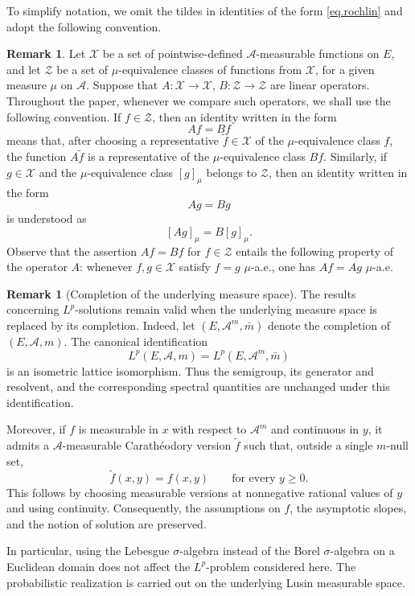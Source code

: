 \documentclass[11pt,a4paper,reqno]{amsart}
\theoremstyle{definition}
\newtheorem{remark}[theorem]{Remark}
\numberwithin{equation}{section}
\begin{document}
To simplify notation, we omit the tildes in identities of the form
\eqref{eq.rochlin} and adopt the following convention. 


\begin{remark}
\label{rem.not}
Let $\mathcal X$ be a set  of pointwise-defined $\mathcal A$-measurable
functions on $E$, and let $\mathcal Z$ be a set  of $\mu$-equivalence
classes of functions from $\mathcal X$, for a given measure $\mu$ on $\mathcal A$.
Suppose that  $A:\mathcal X\to\mathcal X$,  $B:\mathcal Z\to \mathcal Z$  are linear operators.
Throughout the paper, whenever we compare such operators, we shall use the
following convention. If $f\in \mathcal Z$, then an identity written in the
form
\[
Af = Bf
\]
means that, after choosing a representative $\tilde f\in\mathcal X$ of the
$\mu$-equivalence class $f$, the function $A\tilde f$ is a representative
of the $\mu$-equivalence class $Bf$.
Similarly, if $g\in\mathcal X$ and the $\mu$-equivalence class  $[g]_{\mu}$ belongs to $\mathcal Z$, then an identity
written in the form
\[
Ag = Bg
\]
is understood as
\[
[Ag]_{\mu} = B[g]_{\mu}.
\]
Observe that the assertion $Af=Bf$ for $f\in\mathcal Z$ entails the following
property of the operator $A$: whenever $f,g\in\mathcal X$ satisfy
$f=g$ $\mu$-a.e., one has $Af=Ag$ $\mu$-a.e.
\end{remark}
  
\begin{remark}[Completion of the underlying measure space]
The results concerning $L^p$-solutions remain valid when the
underlying measure space is replaced by its completion.
Indeed, let  $(E,\mathcal A^m,\bar m)$ denote the completion of $(E,\mathcal A,m)$.
The canonical identification
\[
L^p(E,\mathcal A,m)
=
L^p(E,\mathcal A^m,\bar m)
\]
is an isometric lattice isomorphism. Thus the semigroup,
its generator and resolvent, and the corresponding spectral
quantities are unchanged under this identification.

Moreover, if $f$ is measurable in $x$ with respect to
$\mathcal A^m$ and continuous in $y$, it admits a
$\mathcal A$-measurable Carath\'eodory version $\widetilde f$
such that, outside a single $m$-null set,
\[
\widetilde f(x,y)=f(x,y)
\qquad\text{for every }y\ge0.
\]
This follows by choosing measurable versions at nonnegative
rational values of $y$ and using continuity.
Consequently, the assumptions on $f$, the asymptotic slopes,
and the notion of solution are preserved.

In particular, using the Lebesgue $\sigma$-algebra instead of
the Borel $\sigma$-algebra on a Euclidean domain does not
affect the $L^p$-problem considered here. The probabilistic
realization is carried out on the underlying Lusin measurable space.
\end{remark}
\end{document}
